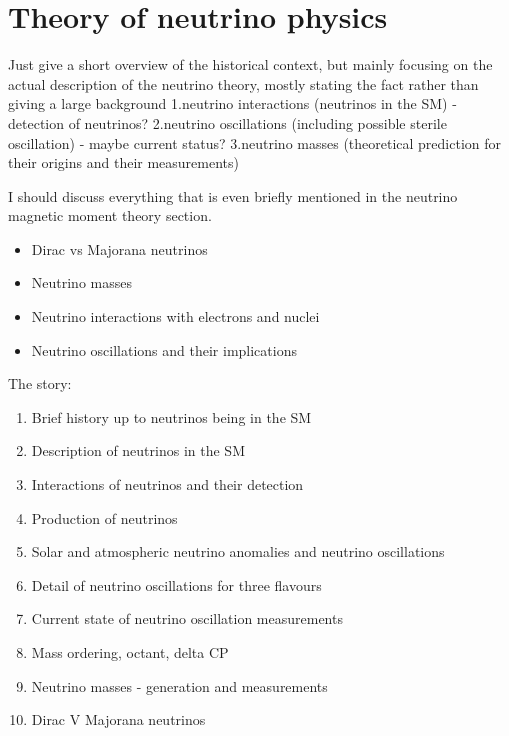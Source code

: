 \chapter{Theory of neutrino physics}\label{sec:NeutrinoTheory}

Just give a short overview of the historical context, but mainly focusing on the actual description of the neutrino theory, mostly stating the fact rather than giving a large background
1.neutrino interactions (neutrinos in the SM) - detection of neutrinos?
2.neutrino oscillations (including possible sterile oscillation) - maybe current status?
3.neutrino masses (theoretical prediction for their origins and their measurements)

I should discuss everything that is even briefly mentioned in the neutrino magnetic moment theory section.
\begin{itemize}
\item Dirac vs Majorana neutrinos
\item Neutrino masses
\item Neutrino interactions with electrons and nuclei
\item Neutrino oscillations and their implications
\end{itemize}

The story:
\begin{enumerate}
\item Brief history up to neutrinos being in the SM
\item Description of neutrinos in the SM
\item Interactions of neutrinos and their detection
\item Production of neutrinos
\item Solar and atmospheric neutrino anomalies and neutrino oscillations
\item Detail of neutrino oscillations for three flavours
\item Current state of neutrino oscillation measurements
\item Mass ordering, octant, delta CP
\item Neutrino masses - generation and measurements
\item Dirac V Majorana neutrinos
\end{enumerate}


